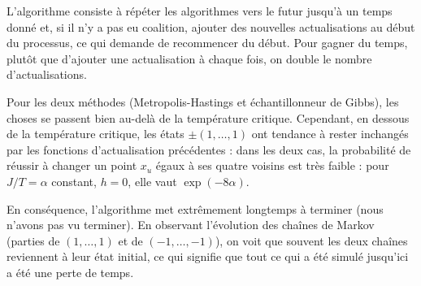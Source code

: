 \documentclass[a4paper,11pt]{article}
\begin{document}
L'algorithme consiste à répéter les algorithmes vers le futur jusqu'à un temps donné et, si il n'y a pas eu coalition, ajouter des nouvelles actualisations au début du processus, ce qui demande de recommencer du début. Pour gagner du temps, plutôt que d'ajouter une actualisation à chaque fois, on double le nombre d'actualisations.

Pour les deux méthodes (Metropolis-Hastings et échantillonneur de Gibbs), les choses se passent bien au-delà de la température critique. Cependant, en dessous de la température critique, les états $\pm(1,\hdots,1)$ ont tendance à rester inchangés par les fonctions d'actualisation précédentes : dans les deux cas, la probabilité de réussir à changer un point $x_u$ égaux à ses quatre voisins est très faible : pour $J/T = \alpha$ constant, $h = 0$, elle vaut $\exp(-8 \alpha)$.

En conséquence, l'algorithme met extrêmement longtemps à terminer (nous n'avons pas vu terminer). En observant l'évolution des chaînes de Markov (parties de $(1,\hdots,1)$ et de $(-1,\hdots,-1)$), on voit que souvent les deux chaînes reviennent à leur état initial, ce qui signifie que tout ce qui a été simulé jusqu'ici a été une perte de temps.
\end{document}
